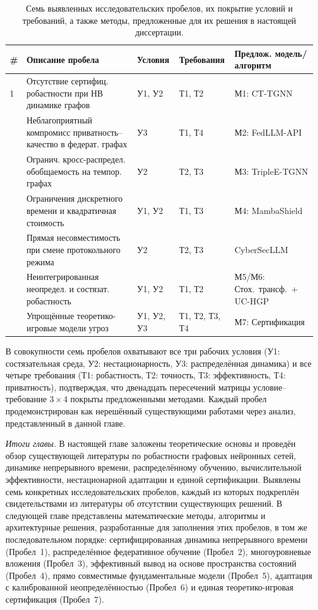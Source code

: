 \begin{table}[htbp]\centering\small
\caption{Семь выявленных исследовательских пробелов, их покрытие условий и требований, а также методы, предложенные для их решения в настоящей диссертации.}
\label{tab:gaps}
\small
\renewcommand{\arraystretch}{0.92}\begin{tabular}{p{0.5cm} p{5.5cm} p{2.5cm} p{2.0cm} p{2.5cm}}
\toprule
\textbf{\#} & \textbf{Описание пробела} & \textbf{Условия} & \textbf{Требо\-вания} & \textbf{Предлож. модель/алгоритм} \\
\midrule
1 & Отсутствие сертифиц. робастности при НВ динамике графов & У1, У2 & Т1, Т2 & М1: CT-TGNN \\
\addlinespace
2 & Неблагоприятный компромисс приватность--качество в федерат. графах & У3 & Т1, Т4 & М2: FedLLM-API \\
\addlinespace
3 & Огранич. кросс-распредел. обобщаемость на темпор. графах & У2 & Т2, Т3 & М3: TripleE-TGNN \\
\addlinespace
4 & Ограничения дискретного времени и квадратичная стоимость & У1, У2 & Т1, Т3 & М4: MambaShield \\
\addlinespace
5 & Прямая несовместимость при смене протокольного режима & У2 & Т2, Т3 & CyberSecLLM \\
\addlinespace
6 & Неинтегрированная неопредел. и состязат. робастность & У1, У2 & Т1, Т2 & М5/М6: Стох.\ трансф.\ + UC-HGP \\
\addlinespace
7 & Упрощённые теоретико-игровые модели угроз & У1, У2, У3 & Т1, Т2, Т3, Т4 & М7: Сертификация \\
\bottomrule
\end{tabular}\end{table}

В совокупности семь пробелов охватывают все три рабочих условия (У1: состязательная среда, У2: нестационарность, У3: распределённая динамика) и все четыре требования (Т1: робастность, Т2: точность, Т3: эффективность, Т4: приватность), подтверждая, что двенадцать пересечений матрицы условие--требование $3\times4$ покрыты предложенными методами. Каждый пробел продемонстрирован как нерешённый существующими работами через анализ, представленный в данной главе.

\medskip
\noindent\textit{Итоги главы.} В настоящей главе заложены теоретические основы и проведён обзор существующей литературы по робастности графовых нейронных сетей, динамике непрерывного времени, распределённому обучению, вычислительной эффективности, нестационарной адаптации и единой сертификации. Выявлены семь конкретных исследовательских пробелов, каждый из которых подкреплён свидетельствами из литературы об отсутствии существующих решений. В следующей главе представлены математические методы, алгоритмы и архитектурные решения, разработанные для заполнения этих пробелов, в том же последовательном порядке: сертифицированная динамика непрерывного времени (Пробел~1), распределённое федеративное обучение (Пробел~2), многоуровневые вложения (Пробел~3), эффективный вывод на основе пространства состояний (Пробел~4), прямо совместимые фундаментальные модели (Пробел~5), адаптация с калиброванной неопределённостью (Пробел~6) и единая теоретико-игровая сертификация (Пробел~7).

